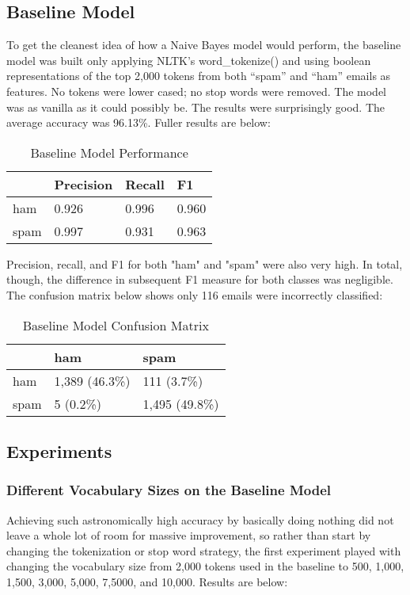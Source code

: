 \documentclass[a4paper]{article}
\begin{document}
	\subsection{Baseline Model}
	
	To get the cleanest idea of how a Naive Bayes model would perform, the baseline model was built only applying NLTK’s word\_tokenize() and using boolean representations of the top 2,000 tokens from both “spam” and “ham” emails as features. No tokens were lower cased; no stop words were removed. The model was as vanilla as it could possibly be. The results were surprisingly good. The average accuracy was 96.13\%. Fuller results are below:
	
	\begin{table}[H]
		\centering
		\caption{Baseline Model Performance}
		\begin{tabular}{l|lll}
			& Precision & Recall & F1 \\
			\hline
			ham & 0.926 & 0.996 & 0.960 \\
			spam & 0.997 & 0.931 & 0.963
		\end{tabular}
	\end{table}

	Precision, recall, and F1 for both "ham" and "spam" were also very high. In total, though, the difference in subsequent F1 measure for both classes was negligible. The confusion matrix below shows only 116 emails were incorrectly classified:

	\begin{table}[H]
		\centering
		\caption{Baseline Model Confusion Matrix}
		\begin{tabular}{l|ll}
			& ham & spam \\
			\hline
			ham & 1,389 (46.3\%) & 111 (3.7\%) \\
			spam & 5 (0.2\%) & 1,495 (49.8\%)
		\end{tabular}
	\end{table}

	\subsection{Experiments}
	
	\subsubsection{Different Vocabulary Sizes on the Baseline Model}
	
	Achieving such astronomically high accuracy by basically doing nothing did not leave a whole lot of room for massive improvement, so rather than start by changing the tokenization or stop word strategy, the first experiment played with changing the vocabulary size from 2,000 tokens used in the baseline to 500, 1,000, 1,500, 3,000, 5,000, 7,5000, and 10,000. Results are below:
	
\end{document}
